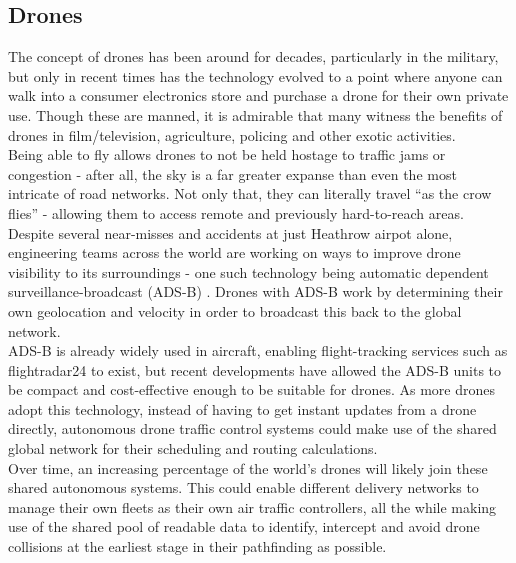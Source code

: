 \documentclass[a4paper,11pt,titlepage]{report}
\begin{document}
\newpage
\subsection{Drones}
The concept of drones has been around for decades, particularly in the military, but only in recent times has the technology evolved to a point where anyone can walk into a consumer electronics store and purchase a drone for their own private use. Though these are manned, it is admirable that many witness the benefits of drones in film/television\cite{Verrier2015}, agriculture\cite{Jarman2016}, policing\cite{BBCNews2017a} and other exotic activities\cite{Roberts2016}. \\

Being able to fly allows drones to not be held hostage to traffic jams or congestion - after all, the sky is a far greater expanse than even the most intricate of road networks. Not only that, they can literally travel ``as the crow flies'' - allowing them to access remote and previously hard-to-reach areas.\\

Despite several near-misses \cite{Davies2017} and accidents\cite{BBCNews2016} at just Heathrow airpot alone, engineering teams across the world are working on ways to improve drone visibility to its surroundings - one such technology being automatic dependent surveillance-broadcast (ADS-B) \cite{Dillow2015}. Drones with ADS-B work by determining their own geolocation and velocity in order to broadcast this back to the global network.\\

ADS-B is already widely used in aircraft, enabling flight-tracking services such as flightradar24 to exist\cite{Flightradar242018}, but recent developments have allowed the ADS-B units to be compact and cost-effective enough to be suitable for drones. As more drones adopt this technology, instead of having to get instant updates from a drone directly, autonomous drone traffic control systems could make use of the shared global network for their scheduling and routing calculations. \\

Over time, an increasing percentage of the world's drones will likely join these shared autonomous systems. This could enable different delivery networks to manage their own fleets as their own air traffic controllers, all the while making use of the shared pool of readable data to identify, intercept and avoid drone collisions at the earliest stage in their pathfinding as possible.
\end{document}
